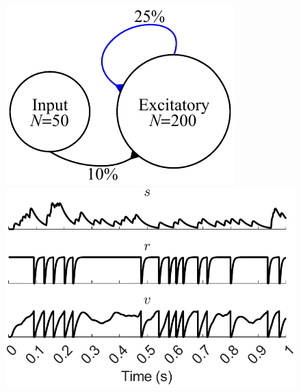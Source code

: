 \documentclass[utf8]{FrontiersinHarvard} %
\begin{document}
\begin{subfigure}
\setcounter{figure}{1}
\setcounter{subfigure}{0}
    \centering
    \begin{minipage}[b]{0.27\textwidth}
        \includegraphics[width=\linewidth]{methods/network_model}
        \caption{}
        \label{figs:methods:network}
    \end{minipage}%
\setcounter{figure}{1}
\setcounter{subfigure}{1}
    \begin{minipage}[b]{0.32\textwidth}
        \includegraphics[width=\linewidth]{methods/neurons_and_synapses}
        \caption{}
        \label{figs:methods:neurons_and_synapses}
    \end{minipage}%
\setcounter{figure}{1}
\setcounter{subfigure}{2}
    \begin{minipage}[b]{0.25\textwidth}

\end{minipage}
\end{subfigure}
\end{document}
